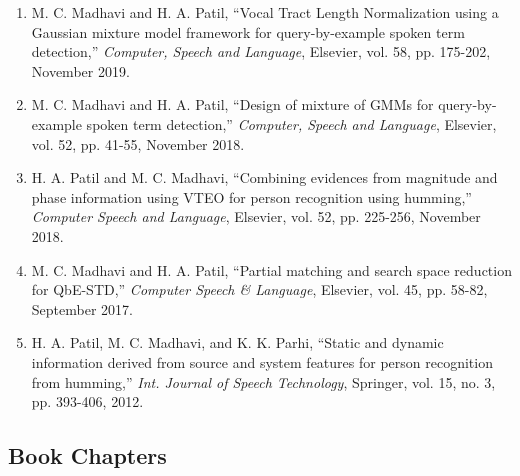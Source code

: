 \documentclass[10pt]{article}
\begin{document}
\begin{enumerate}
\item M. C. Madhavi and H. A. Patil, ``Vocal Tract Length Normalization using a Gaussian mixture model framework for query-by-example spoken term detection,'' \textit{Computer, Speech and Language}, Elsevier, vol. 58, pp. 175-202, November 2019.

\item M. C. Madhavi and H. A. Patil, ``Design of mixture of GMMs for query-by-example spoken term detection,'' \textit{Computer, Speech and Language}, Elsevier, vol. 52, pp. 41-55, November 2018.

\item H. A. Patil and M. C. Madhavi, ``Combining evidences from magnitude and phase information using VTEO for person recognition using humming,'' \textit{Computer Speech and Language}, Elsevier, vol. 52, pp. 225-256, November 2018.

\item M. C. Madhavi and H. A. Patil, ``Partial matching and search space reduction for QbE-STD,'' \textit{Computer Speech \& Language}, Elsevier, vol. 45, pp. 58-82, September 2017.

\item H. A. Patil, M. C. Madhavi, and K. K. Parhi, ``Static and dynamic information derived from source and system features for person recognition from humming,'' \textit{Int. Journal of Speech Technology}, Springer, vol. 15, no. 3, pp. 393-406, 2012.
\end{enumerate}

\subsection*{Book Chapters}
\end{document}
